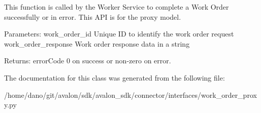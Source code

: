 \begin{DoxyVerb}This function is called by the Worker Service to
complete a Work Order successfully or in error.
This API is for the proxy model.

Parameters:
work_order_id       Unique ID to identify the work order request
work_order_response Work order response data in a string

Returns:
errorCode           0 on success or non-zero on error.
\end{DoxyVerb}
 

The documentation for this class was generated from the following file\+:\begin{DoxyCompactItemize}
\item 
/home/dano/git/avalon/sdk/avalon\+\_\+sdk/connector/interfaces/work\+\_\+order\+\_\+proxy.\+py\end{DoxyCompactItemize}
